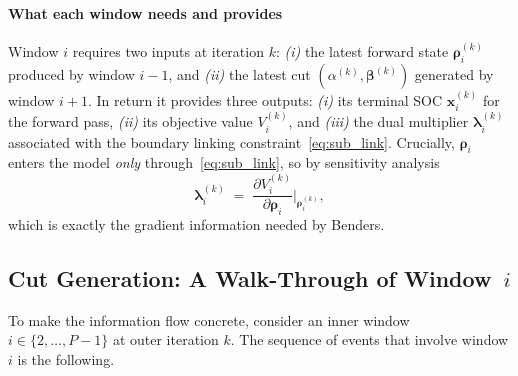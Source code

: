 \paragraph*{What each window needs and provides}
Window $i$ requires two inputs at iteration $k$:
\textit{(i)} the latest forward state $\bm{\rho}_i^{(k)}$ produced by
window $i{-}1$, and
\textit{(ii)} the latest cut $(\alpha^{(k)},\bm{\beta}^{(k)})$
generated by window $i{+}1$. In return it provides three outputs:
\textit{(i)} its terminal SOC $\bm{x}_i^{(k)}$ for the forward pass,
\textit{(ii)} its objective value $V_i^{(k)}$, and
\textit{(iii)} the dual multiplier $\bm{\lambda}_i^{(k)}$ associated
with the boundary linking constraint~\eqref{eq:sub_link}. Crucially,
$\bm{\rho}_i$ enters the model \emph{only} through~\eqref{eq:sub_link},
so by sensitivity analysis
\begin{equation}
\label{eq:dual_sens}
\bm{\lambda}_i^{(k)} \;=\;
\frac{\partial V_i^{(k)}}{\partial \bm{\rho}_i}\bigg|_{\bm{\rho}_i^{(k)}},
\end{equation}
which is exactly the gradient information needed by Benders.

\subsection{Cut Generation: A Walk-Through of Window~$i$}
\label{ssec:cut_example}

To make the information flow concrete, consider an inner window
$i\in\{2,\dots,P{-}1\}$ at outer iteration $k$. The sequence of events
that involve window $i$ is the following.

